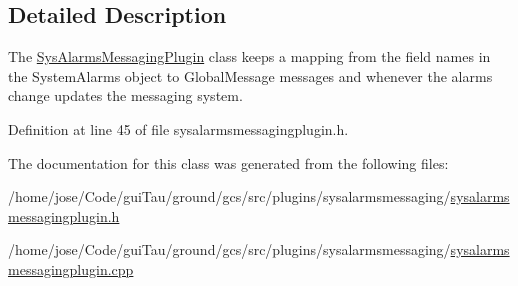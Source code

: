 \subsection{Detailed Description}
The \hyperlink{class_sys_alarms_messaging_plugin}{Sys\-Alarms\-Messaging\-Plugin} class keeps a mapping from the field names in the System\-Alarms object to Global\-Message messages and whenever the alarms change updates the messaging system. 

Definition at line 45 of file sysalarmsmessagingplugin.\-h.



The documentation for this class was generated from the following files\-:\begin{DoxyCompactItemize}
\item 
/home/jose/\-Code/gui\-Tau/ground/gcs/src/plugins/sysalarmsmessaging/\hyperlink{sysalarmsmessagingplugin_8h}{sysalarmsmessagingplugin.\-h}\item 
/home/jose/\-Code/gui\-Tau/ground/gcs/src/plugins/sysalarmsmessaging/\hyperlink{sysalarmsmessagingplugin_8cpp}{sysalarmsmessagingplugin.\-cpp}\end{DoxyCompactItemize}
